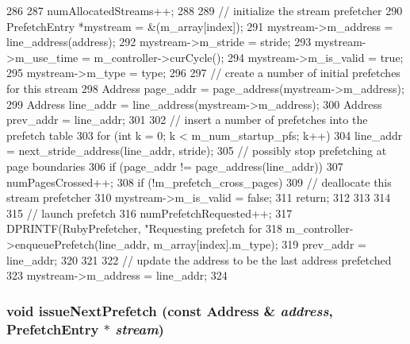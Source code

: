 \begin{DoxyCode}
286 {
287     numAllocatedStreams++;
288 
289     // initialize the stream prefetcher
290     PrefetchEntry *mystream = &(m_array[index]);
291     mystream->m_address = line_address(address);
292     mystream->m_stride = stride;
293     mystream->m_use_time = m_controller->curCycle();
294     mystream->m_is_valid = true;
295     mystream->m_type = type;
296 
297     // create a number of initial prefetches for this stream
298     Address page_addr = page_address(mystream->m_address);
299     Address line_addr = line_address(mystream->m_address);
300     Address prev_addr = line_addr;
301 
302     // insert a number of prefetches into the prefetch table
303     for (int k = 0; k < m_num_startup_pfs; k++) {
304         line_addr = next_stride_address(line_addr, stride);
305         // possibly stop prefetching at page boundaries
306         if (page_addr != page_address(line_addr)) {
307             numPagesCrossed++;
308             if (!m_prefetch_cross_pages) {
309                 // deallocate this stream prefetcher
310                 mystream->m_is_valid = false;
311                 return;
312             }
313         }
314 
315         // launch prefetch
316         numPrefetchRequested++;
317         DPRINTF(RubyPrefetcher, "Requesting prefetch for %
318         m_controller->enqueuePrefetch(line_addr, m_array[index].m_type);
319         prev_addr = line_addr;
320     }
321 
322     // update the address to be the last address prefetched
323     mystream->m_address = line_addr;
324 }
\end{DoxyCode}
\hypertarget{classPrefetcher_a837cf1d68756e156957f5d7c36d5da7e}{
\subsubsection[{issueNextPrefetch}]{\setlength{\rightskip}{0pt plus 5cm}void issueNextPrefetch (const {\bf Address} \& {\em address}, \/  {\bf PrefetchEntry} $\ast$ {\em stream})}}
\label{classPrefetcher_a837cf1d68756e156957f5d7c36d5da7e}



